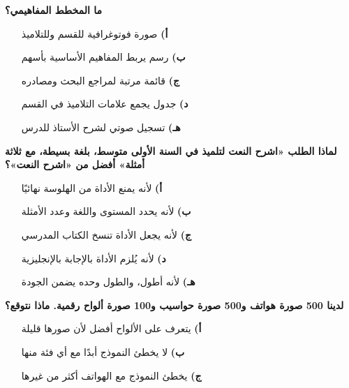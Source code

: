 \documentclass[11pt,a4paper]{article}
\begin{document}
\begin{multicols}{2}
\begin{minipage}{\linewidth}
\hangindent=0.7cm\textbf{ما المخطط المفاهيمي؟}
\begin{itemize}[leftmargin=0.95cm, labelsep=4pt, itemsep=0pt, topsep=2pt, parsep=0pt]
  \item[\textbf{أ)}] صورة فوتوغرافية للقسم وللتلاميذ
  \item[\textbf{ب)}] رسم يربط المفاهيم الأساسية بأسهم
  \item[\textbf{ج)}] قائمة مرتبة لمراجع البحث ومصادره
  \item[\textbf{د)}] جدول يجمع علامات التلاميذ في القسم
  \item[\textbf{هـ)}] تسجيل صوتي لشرح الأستاذ للدرس
\end{itemize}
\end{minipage}\par\vspace{7pt plus 4pt}
\noindent\begin{minipage}{\linewidth}
\hangindent=0.7cm\textbf{لماذا الطلب «اشرح النعت لتلميذ في السنة الأولى متوسط، بلغة بسيطة، مع ثلاثة أمثلة» أفضل من «اشرح النعت»؟}
\begin{itemize}[leftmargin=0.95cm, labelsep=4pt, itemsep=0pt, topsep=2pt, parsep=0pt]
  \item[\textbf{أ)}] لأنه يمنع الأداة من الهلوسة نهائيًا
  \item[\textbf{ب)}] لأنه يحدد المستوى واللغة وعدد الأمثلة
  \item[\textbf{ج)}] لأنه يجعل الأداة تنسخ الكتاب المدرسي
  \item[\textbf{د)}] لأنه يُلزم الأداة بالإجابة بالإنجليزية
  \item[\textbf{هـ)}] لأنه أطول، والطول وحده يضمن الجودة
\end{itemize}
\end{minipage}\par\vspace{7pt plus 4pt}
\noindent\begin{minipage}{\linewidth}
\hangindent=0.7cm\textbf{لدينا 500 صورة هواتف و500 صورة حواسيب و100 صورة ألواح رقمية. ماذا نتوقع؟}
\begin{itemize}[leftmargin=0.95cm, labelsep=4pt, itemsep=0pt, topsep=2pt, parsep=0pt]
  \item[\textbf{أ)}] يتعرف على الألواح أفضل لأن صورها قليلة
  \item[\textbf{ب)}] لا يخطئ النموذج أبدًا مع أي فئة منها
  \item[\textbf{ج)}] يخطئ النموذج مع الهواتف أكثر من غيرها

\end{itemize}
\end{minipage}
\end{multicols}
\end{document}
